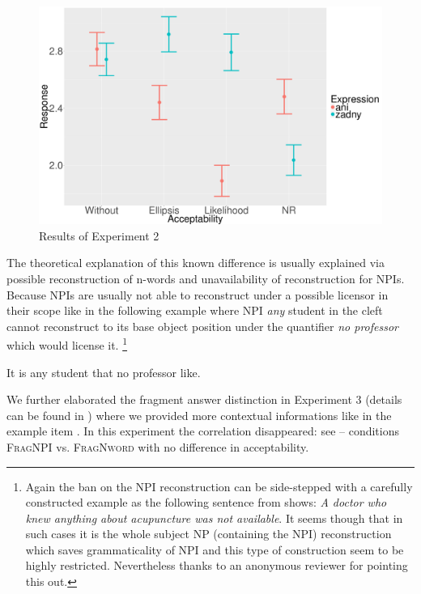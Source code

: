 \documentclass[output=paper,
]{langscibook}
\begin{document}
\begin{figure}
\centering
\includegraphics[scale=0.25]{figures/mean-sum.pdf}
\caption{Results of Experiment 2}\label{fig:exp2}
\end{figure}

\noindent The theoretical explanation of this known difference is usually explained via possible reconstruction of n-words and unavailability of reconstruction for NPIs. Because NPIs are usually not able to reconstruct under a possible licensor in their scope \citep{de1998licensing} like in the following example where NPI \textit{any} student in the cleft cannot reconstruct to its base object position under the quantifier \textit{no professor} which would license it.%
\footnote{Again the ban on the NPI reconstruction can be side-stepped with a carefully constructed example as the following sentence from \cite[p.17]{uribe1994interface} shows: \textit{A doctor who knew anything about acupuncture was not available}. It seems though that in such cases it is the whole subject NP (containing the NPI) reconstruction which saves grammaticality of NPI and this type of construction seem to be highly restricted. Nevertheless thanks to an anonymous reviewer for pointing this out.}

\ea *It is any student that no professor like.
\z

\noindent We further elaborated the fragment answer distinction in Experiment 3 (details can be found in \citealt{docekaldotlacilsubber}) where we provided more contextual informations like in the example item . In this experiment the correlation disappeared: see  -- conditions \textsc{FragNPI} vs. \textsc{FragNword} with no difference in acceptability.
\end{document}
